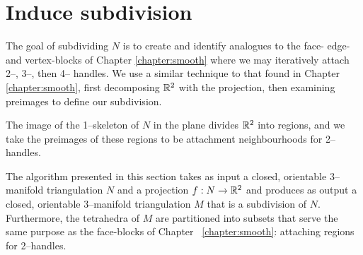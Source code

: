 \section{Induce subdivision}

The goal of subdividing $N$ is to create and identify analogues to the face- edge- and vertex-blocks of Chapter \ref{chapter:smooth} where we may iteratively attach 2--, 3--, then 4-- handles.
We use a similar technique to that found in Chapter \ref{chapter:smooth}, first decomposing $\mathbb{R}^2$ with the projection, then examining preimages to define our subdivision.

The image of the 1--skeleton of $N$ in the plane divides $\mathbb{R}^2$ into regions, and we take the preimages of these regions to be attachment neighbourhoods for 2--handles.

The algorithm presented in this section takes as input a closed, orientable 3--manifold triangulation $N$ and a projection $f:N\to\mathbb{R}^2$ and produces as output a closed, orientable 3--manifold triangulation $M$ that is a subdivision of $N$.
Furthermore, the tetrahedra of $M$ are partitioned into subsets that serve the same purpose as the face-blocks of Chapter ~\ref{chapter:smooth}: attaching regions for 2--handles.
